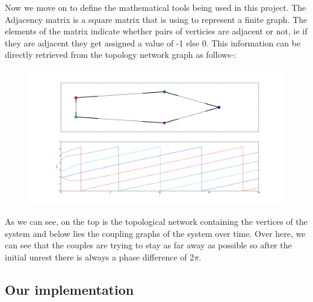 Now we move on to define the mathematical tools being used in this project. The Adjacency matrix is a square matrix that is using to represent a finite graph. The elements of the matrix indicate whether pairs of verticies are adjacent or not, ie if they are adjacent they get assigned a value of -1 else 0. This information can be directly retrieved from the topology network graph as follows-:

\begin{figure}[h!]
\centering
\includegraphics[width=\linewidth]{imgs/examplefigure}
\caption{}
\end{figure}

As we can see, on the top is the topological network containing the vertices of the system and below lies the coupling graphs of the system over time. Over here, we can see that the couples are trying to stay as far away as possible so after the initial unrest there is always a phase difference of 2$\pi$. 


\subsection{Our implementation}

